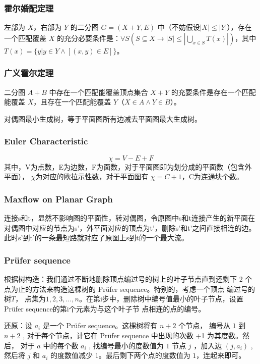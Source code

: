 \subsubsection{霍尔婚配定理}

左部为 $X$，右部为 $Y$ 的二分图 $G=(X+Y,E)$ 中（不妨假设$|X|\le|Y|$），存在一个匹配覆盖 $X$ 的充分必要条件是：$\displaystyle\forall S(S\subseteq X \to\left|S\right|\le\left|\bigcup\limits_{x\in S}T(x)\right|)$，其中 $T(x)=\{y|y\in Y\land\left[(x,y)\in E\right]\}$。

\subsubsection{广义霍尔定理}

二分图 $A+B$ 中存在一个匹配能覆盖顶点集合 $X+Y$ 的充要条件是存在一个匹配能覆盖 $X$，且存在一个匹配能覆盖 $Y$（$X\in A\land Y\in B$）。


对偶图最小生成树，等于平面图所有边减去平面图最大生成树。

\subsubsection{Euler Characteristic}
$$ \chi = V-E+F $$
其中，V为点数，E为边数，F为面数，对于平面图即为划分成的平面数（包含外平面），
$ \chi $为对应的欧拉示性数，对于平面图有 $ \chi = C + 1 $，C为连通块个数。

\subsubsection{Maxflow on Planar Graph}
连接s和t，显然不影响图的平面性，转对偶图，令原图中s和t连接产生的新平面在对偶图中对应的节点为s'，外平面对应的顶点为t'，删除s'和t'之间直接相连的边。
此时s'到t'的一条最短路就对应了原图上s到t的一个最大流。

\subsubsection{Prüfer sequence}
根据树构造：我们通过不断地删除顶点编过号的树上的叶子节点直到还剩下 2 个点为止的方法来构造这棵树的 Prüfer sequence。特别的，考虑一个顶点
编过号的树$T$， 点集为$ { 1, 2, 3, \ldots , n} $。在第i步中，删除树中编号值最小的叶子节点，设置Prüfer sequence的第i个元素为与这个叶子节
点相连的点的编号。

还原：设 $a_i$ 是一个 Prüfer sequence。这棵树将有 $n + 2$ 个节点， 编号从 $1$ 到 $n + 2$ , 对于每个节点，计它在 Prüfer sequence 中出现的次数 +1 为其度数。然后， 对于 $a$ 中的每个数 $a_i$ , 找编号最小的度数值为 $1$ 节点 $j$ ，加入边 $(j,a_i)$ , 然后将 $j$ 和 $a_i$ 的度数值减少 $1$。最后剩下两个点的度数值为 $1$，连起来即可。

